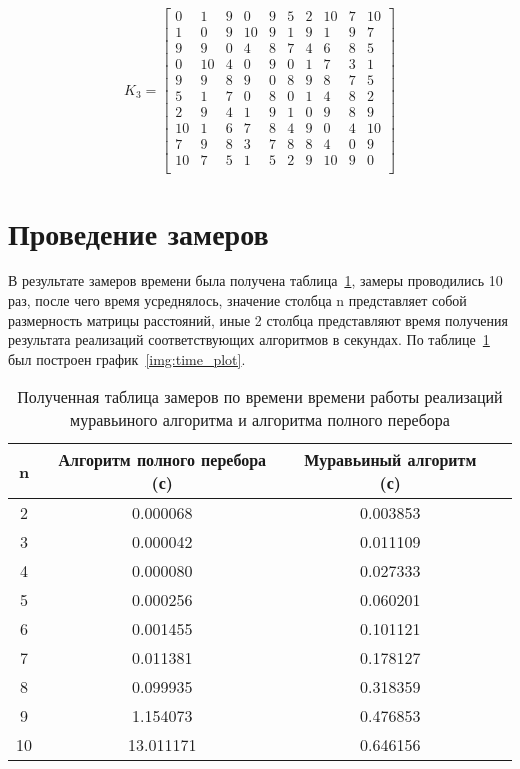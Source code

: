 \begin{equation}
	\label{eq:kd3}
K_{3} = \begin{bmatrix}
	0 & 1 & 9 & 0 & 9 & 5 & 2 & 10 & 7 & 10 \\
	1 & 0 & 9 & 10 & 9 & 1 & 9 & 1 & 9 & 7 \\
	9 & 9 & 0 & 4 & 8 & 7 & 4 & 6 & 8 & 5 \\
	0 & 10 & 4 & 0 & 9 & 0 & 1 & 7 & 3 & 1 \\
	9 & 9 & 8 & 9 & 0 & 8 & 9 & 8 & 7 & 5 \\
	5 & 1 & 7 & 0 & 8 & 0 & 1 & 4 & 8 & 2 \\
	2 & 9 & 4 & 1 & 9 & 1 & 0 & 9 & 8 & 9 \\
	10 & 1 & 6 & 7 & 8 & 4 & 9 & 0 & 4 & 10 \\
	7 & 9 & 8 & 3 & 7 & 8 & 8 & 4 & 0 & 9 \\
	10 & 7 & 5 & 1 & 5 & 2 & 9 & 10 & 9 & 0 \\
\end{bmatrix}
\end{equation}

\section{Проведение замеров}
В результате замеров времени была получена таблица~\ref{t:timings}, замеры проводились 10 раз, после чего время усреднялось, значение столбца n представляет собой размерность матрицы расстояний, иные 2 столбца представляют время получения результата реализаций соответствующих алгоритмов в секундах. По таблице~\ref{t:timings} был построен график~\ref{img:time_plot}.

\begin{table}[ht]
	\centering
	\caption{Полученная таблица замеров по времени времени работы реализаций муравьиного алгоритма и алгоритма полного перебора}
	\begin{tabular}{|c|c|c|c|}
	\hline
	n & Алгоритм полного перебора (с) & Муравьиный алгоритм (с) \\ \hline
   2 &   0.000068 &   0.003853 \\ \hline
3 &   0.000042 &   0.011109 \\ \hline
4 &   0.000080 &   0.027333 \\ \hline
5 &   0.000256 &   0.060201 \\ \hline
6 &   0.001455 &   0.101121 \\ \hline
7 &   0.011381 &   0.178127 \\ \hline
8 &   0.099935 &   0.318359 \\ \hline
9 &   1.154073 &   0.476853 \\ \hline
10 &  13.011171 &   0.646156 \\ \hline

	\end{tabular}
\label{t:timings}
\end{table}

